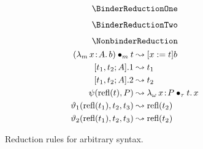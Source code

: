 
\begin{figure}
    \centering
    \begin{minipage}{0.5\textwidth}
        $$\BinderReductionOne$$
    \end{minipage}%
    \begin{minipage}{0.5\textwidth}
        $$\BinderReductionTwo$$
    \end{minipage}%
    $$\NonbinderReduction$$
    \begin{align*}
        ({\lambda_m}\, x\! : \! A.\, b) \bullet_{m} t &\leadsto [x := t]b \\
        [t_1, t_2; A].1 &\leadsto t_1 \\
        [t_1, t_2; A].2 &\leadsto t_2 \\
        \psi(\text{refl}(t),P) &\leadsto {\lambda_\omega}\, x\! : \! P \bullet_{\tau} t.\, x \\
        \vartheta_1(\text{refl}(t_1), t_2, t_3) &\leadsto \text{refl}(t_2) \\
        \vartheta_2(\text{refl}(t_1), t_2, t_3) &\leadsto \text{refl}(t_2) \\
    \end{align*}
    \caption{Reduction rules for arbitrary syntax.}
\end{figure}


